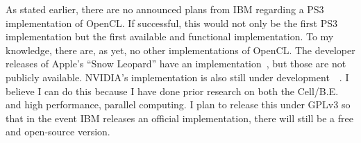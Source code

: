 As stated earlier, there are no announced plans from
IBM regarding a PS3 implementation of OpenCL. If successful,
this would not only be the first PS3 implementation but
the first available and functional implementation.
To my knowledge, there are, as yet, no other implementations
of OpenCL. The developer releases of Apple's ``Snow Leopard''
have an implementation~\cite{applepr}, but those are not publicly available.
NVIDIA's implementation is also still under development~\cite{nvidiapr}~\cite{nvidiademo}.
I believe I can do this because I have done prior
research on both the Cell/B.E. and high performance,
parallel computing. I plan to release this under 
GPLv3 so that in the event IBM releases an official implementation,
there will still be a free and open-source version.
